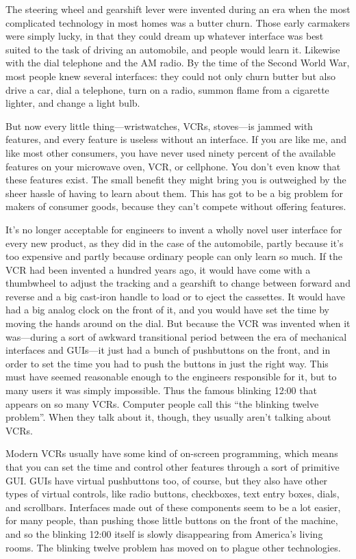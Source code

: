 \documentclass[
  fontsize=11pt,
  paper=landscape,
  twocolumn=true,
  pagesize=pdftex,
  headings=small,
  DIV=15,
  ]{scrartcl}
\begin{document}
The steering wheel and gearshift lever were invented during an era when
the most complicated technology in most homes was a butter churn. Those
early carmakers were simply lucky, in that they could dream up whatever
interface was best suited to the task of driving an automobile, and
people would learn it. Likewise with the dial telephone and the AM
radio. By the time of the Second World War, most people knew several
interfaces: they could not only churn butter but also drive a car, dial
a telephone, turn on a radio, summon flame from a cigarette lighter, and
change a light bulb.

But now every little thing---wristwatches, VCRs, stoves---is jammed with
features, and every feature is useless without an interface. If you are
like me, and like most other consumers, you have never used ninety
percent of the available features on your microwave oven, VCR, or
cellphone. You don't even know that these features exist. The small
benefit they might bring you is outweighed by the sheer hassle of having
to learn about them. This has got to be a big problem for makers of
consumer goods, because they can't compete without offering features.

It's no longer acceptable for engineers to invent a wholly novel user
interface for every new product, as they did in the case of the
automobile, partly because it's too expensive and partly because
ordinary people can only learn so much. If the VCR had been invented a
hundred years ago, it would have come with a thumbwheel to adjust the
tracking and a gearshift to change between forward and reverse and a big
cast-iron handle to load or to eject the cassettes. It would have had a
big analog clock on the front of it, and you would have set the time by
moving the hands around on the dial. But because the VCR was invented
when it was---during a sort of awkward transitional period between the
era of mechanical interfaces and GUIs---it just had a bunch of
pushbuttons on the front, and in order to set the time you had to push
the buttons in just the right way. This must have seemed reasonable
enough to the engineers responsible for it, but to many users it was
simply impossible. Thus the famous blinking 12:00 that appears on so
many VCRs. Computer people call this ``the blinking twelve problem''.
When they talk about it, though, they usually aren't talking about VCRs.

Modern VCRs usually have some kind of on-screen programming, which means
that you can set the time and control other features through a sort of
primitive GUI. GUIs have virtual pushbuttons too, of course, but they
also have other types of virtual controls, like radio buttons,
checkboxes, text entry boxes, dials, and scrollbars. Interfaces made out
of these components seem to be a lot easier, for many people, than
pushing those little buttons on the front of the machine, and so the
blinking 12:00 itself is slowly disappearing from America's living
rooms. The blinking twelve problem has moved on to plague other
technologies.
\end{document}
